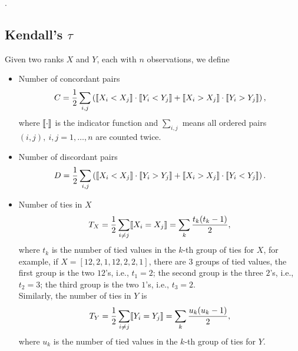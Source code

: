 .



\subsection{Kendall's $\tau$}
\label{sec:kendalltau}

Given two ranks $X$ and $Y$, each with $n$ observations, we define
\begin{itemize}
\item Number of concordant pairs 
      \begin{equation*}
      C = \frac{1}{2} \sum_{i,j} \left( \llbracket X_i < X_j \rrbracket \cdot \llbracket Y_i < Y_j \rrbracket + \llbracket X_i > X_j \rrbracket \cdot \llbracket Y_i > Y_j \rrbracket \right),
      \end{equation*}
      where $\llbracket \cdot \rrbracket$ is the indicator function and 
      $\sum_{i,j}$ means all ordered pairs $(i, j),~ i,j=1,\dots,n$ are counted twice.

\item Number of discordant pairs 
      \begin{equation*}
      D = \frac{1}{2} \sum_{i,j} \left( \llbracket X_i < X_j \rrbracket \cdot \llbracket Y_i > Y_j \rrbracket + \llbracket X_i > X_j \rrbracket \cdot \llbracket Y_i < Y_j \rrbracket \right).
      \end{equation*}

\item Number of ties in $X$
      \begin{equation*}
      T_X = \frac{1}{2} \sum_{i \ne j} \llbracket X_i = X_j \rrbracket = \sum_k \frac{t_k (t_k - 1)}{2},
      \end{equation*}
      where $t_k$ is the number of tied values in the $k$-th group of ties for $X$, for example, if
      $X = [12, 2, 1, 12, 2, 2, 1]$, there are $3$ groups of tied values, the first group is the two $12$'s, i.e., $t_1 = 2$;
      the second group is the three $2$'s, i.e., $t_2 = 3$; the third group is the two $1$'s, i.e., $t_3 = 2$. \\
      Similarly, the number of ties in $Y$ is 
      \begin{equation*}
      T_Y = \frac{1}{2} \sum_{i \ne j} \llbracket Y_i = Y_j \rrbracket = \sum_k \frac{u_k (u_k - 1)}{2},
      \end{equation*}
      where $u_k$ is the number of tied values in the $k$-th group of ties for $Y$.


\end{itemize}
